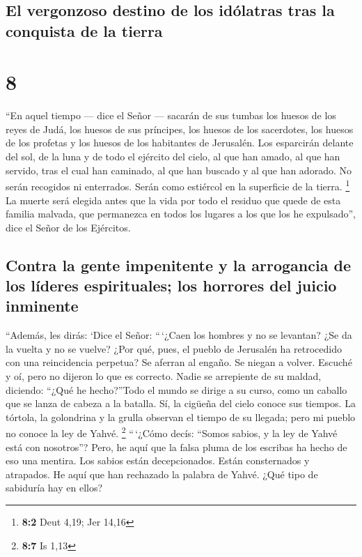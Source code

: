 \hypertarget{el-vergonzoso-destino-de-los-iduxf3latras-tras-la-conquista-de-la-tierra}{%
\subsection{El vergonzoso destino de los idólatras tras la conquista de
la
tierra}\label{el-vergonzoso-destino-de-los-iduxf3latras-tras-la-conquista-de-la-tierra}}

\hypertarget{section-7}{%
\section{8}\label{section-7}}

 ``En aquel tiempo --- dice el Señor --- sacarán de sus
tumbas los huesos de los reyes de Judá, los huesos de sus príncipes, los
huesos de los sacerdotes, los huesos de los profetas y los huesos de los
habitantes de Jerusalén.  Los esparcirán delante del sol,
de la luna y de todo el ejército del cielo, al que han amado, al que han
servido, tras el cual han caminado, al que han buscado y al que han
adorado. No serán recogidos ni enterrados. Serán como estiércol en la
superficie de la tierra. \footnote{\textbf{8:2} Deut 4,19; Jer 14,16}
 La muerte será elegida antes que la vida por todo el
residuo que quede de esta familia malvada, que permanezca en todos los
lugares a los que los he expulsado'', dice el Señor de los Ejércitos.

\hypertarget{contra-la-gente-impenitente-y-la-arrogancia-de-los-luxedderes-espirituales-los-horrores-del-juicio-inminente}{%
\subsection{Contra la gente impenitente y la arrogancia de los líderes
espirituales; los horrores del juicio
inminente}\label{contra-la-gente-impenitente-y-la-arrogancia-de-los-luxedderes-espirituales-los-horrores-del-juicio-inminente}}

 ``Además, les dirás: `Dice el Señor: ``\,`¿Caen los
hombres y no se levantan? ¿Se da la vuelta y no se vuelve?
 ¿Por qué, pues, el pueblo de Jerusalén ha retrocedido con
una reincidencia perpetua? Se aferran al engaño. Se niegan a volver.
 Escuché y oí, pero no dijeron lo que es correcto. Nadie
se arrepiente de su maldad, diciendo: ``¿Qué he hecho?''Todo el mundo se
dirige a su curso, como un caballo que se lanza de cabeza a la batalla.
 Sí, la cigüeña del cielo conoce sus tiempos. La tórtola,
la golondrina y la grulla observan el tiempo de su llegada; pero mi
pueblo no conoce la ley de Yahvé. \footnote{\textbf{8:7} Is 1,13}
 ``\,`¿Cómo decís: ``Somos sabios, y la ley de Yahvé está
con nosotros''? Pero, he aquí que la falsa pluma de los escribas ha
hecho de eso una mentira.  Los sabios están decepcionados.
Están consternados y atrapados. He aquí que han rechazado la palabra de
Yahvé. ¿Qué tipo de sabiduría hay en ellos?

